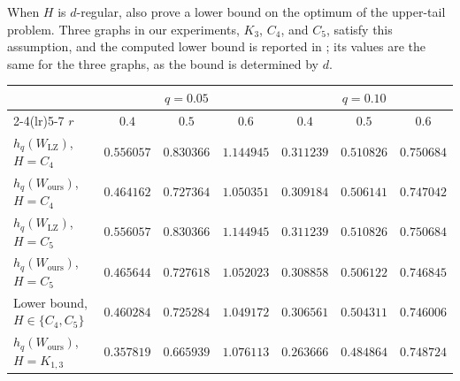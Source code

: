 \documentclass{article}
\theoremstyle{plain}
\theoremstyle{definition}
\theoremstyle{remark}
\begin{document}
When $H$ is $d$-regular, \citet{lubetzky2015replica} also prove a lower bound on the optimum of the upper-tail problem. Three graphs in our experiments, $K_3$, $C_4$, and $C_5$, satisfy this assumption, and the computed lower bound is reported in ; its values are the same for the three graphs, as the bound is determined by $d$.

\begin{table}[t]
  \centering
  {\small
  \begin{tabular}{lcccccc}
    \toprule
    & \multicolumn{3}{c}{$q=0.05$} & \multicolumn{3}{c}{$q=0.10$} \\
    \cmidrule(lr){2-4}\cmidrule(lr){5-7}
    $r$ & $0.4$ & $0.5$ & $0.6$ & $0.4$ & $0.5$ & $0.6$ \\
    \midrule
    $h_q(W_{\mathrm{LZ}})$, $H=C_4$    & $0.556057$ & $0.830366$ & $1.144945$ & $0.311239$ & $0.510826$ & $0.750684$ \\
    $h_q(W_{\mathrm{ours}})$, $H=C_4$  & $0.464162$ & $0.727364$ & $1.050351$ & $0.309184$ & $0.506141$ & $0.747042$ \\
    \midrule
    $h_q(W_{\mathrm{LZ}})$, $H=C_5$    & $0.556057$ & $0.830366$ & $1.144945$ & $0.311239$ & $0.510826$ & $0.750684$ \\
    $h_q(W_{\mathrm{ours}})$, $H=C_5$  & $0.465644$ & $0.727618$ & $1.052023$ & $0.308858$ & $0.506122$ & $0.746845$ \\
    \midrule
    Lower bound, $H\in\{C_4,C_5\}$    & $0.460284$ & $0.725284$ & $1.049172$ & $0.306561$ & $0.504311$ & $0.746006$ \\
    \midrule
    $h_q(W_{\mathrm{ours}})$, $H=K_{1,3}$    & $0.357819$ & $0.665939$ & $1.076113$ & $0.263666$ & $0.484864$ & $0.748724$ \\
    \bottomrule
  \end{tabular}
  }
\end{table}
\end{document}
